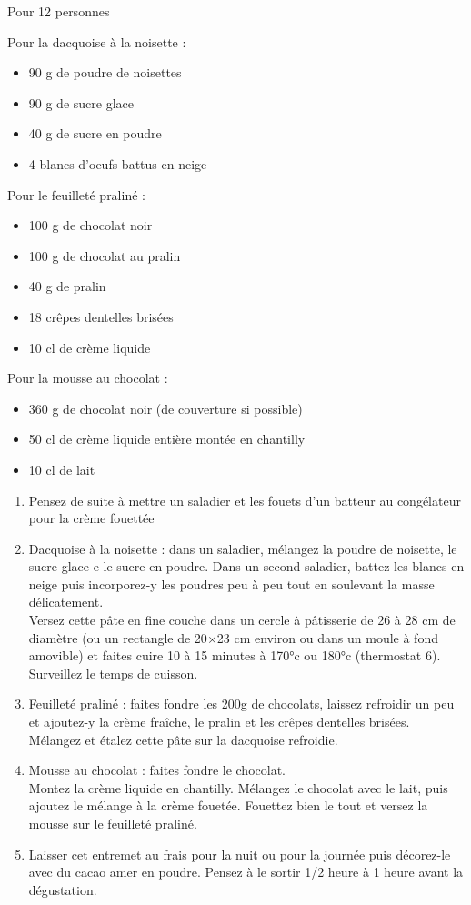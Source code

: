 \medskip
\phantom{.}

\bigskip
{}
{Pour 12 personnes}{Pour la dacquoise à la noisette :
\begin{itemize}
	\item 90 g de poudre de noisettes
	\item 90 g de sucre glace
	\item 40 g de sucre en poudre
	\item 4 blancs d'oeufs battus en neige
\end{itemize}
Pour le feuilleté praliné :
\begin{itemize}
	\item 100 g de chocolat noir
	\item 100 g de chocolat au pralin
	\item 40 g de pralin
	\item 18 crêpes dentelles brisées
	\item 10 cl de crème liquide
\end{itemize}
Pour la mousse au chocolat :
\begin{itemize}
	\item 360 g de chocolat noir (de couverture si possible)
	\item 50 cl de crème liquide entière montée en chantilly
	\item 10 cl de lait
\end{itemize}}
{\phantom{.}

\medskip
\begin{enumerate}
	\item Pensez de suite à mettre un saladier et les fouets d'un batteur au congélateur pour la crème fouettée
	\item Dacquoise à la noisette : dans un saladier, mélangez la poudre de noisette, le sucre glace e le sucre en poudre. Dans un second saladier, battez les blancs en neige puis incorporez-y les poudres peu à peu tout en soulevant la masse délicatement.\\
Versez cette pâte en fine couche dans un cercle à pâtisserie de 26 à 28 cm de diamètre (ou un rectangle de 20$\times$23 cm environ ou dans un moule à fond amovible) et faites cuire 10 à 15 minutes à 170°c ou 180°c (thermostat 6). Surveillez le temps de cuisson. 
	\item Feuilleté praliné : faites fondre les 200g de chocolats, laissez refroidir un peu et ajoutez-y la crème fraîche, le pralin et les crêpes dentelles brisées. Mélangez et étalez cette pâte sur la dacquoise refroidie. 
	\item Mousse au chocolat : faites fondre le chocolat. \\
Montez la crème liquide en chantilly. Mélangez le chocolat avec le lait, puis ajoutez le mélange à la crème fouetée. Fouettez bien le tout et versez la mousse sur le feuilleté praliné.
	\item Laisser cet entremet au frais pour la nuit ou pour la journée puis décorez-le avec du cacao amer en poudre. Pensez à le sortir 1/2 heure à 1 heure avant la dégustation.
\end{enumerate}

\medskip
\phantom{.}}


